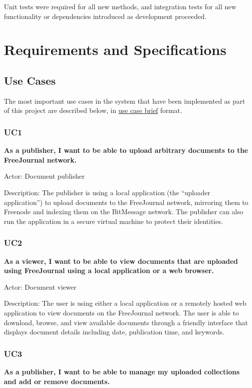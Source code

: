 \documentclass[letterpaper,10pt,oneside]{sphinxmanual}
\begin{document}
Unit tests were required for all new methods, and integration tests for all new functionality or dependencies
introduced as development proceeded.


\chapter{Requirements and Specifications}
\label{requirements:requirements-and-specifications}\label{requirements::doc}

\section{Use Cases}
\label{requirements:use-cases}
The most important use cases in the system that have been implemented as part of this project are described below, in
\href{http://tynerblain.com/blog/2007/04/24/apr-use-case-briefs/}{use case brief} format.


\subsection{UC1}
\label{requirements:uc1}
\textbf{As a publisher, I want to be able to upload arbitrary documents to the FreeJournal network.}

Actor: Document publisher

Description: The publisher is using a local application (the ``uploader application'') to upload documents to the FreeJournal
network, mirroring them to Freenode and indexing them on the BitMessage network.  The publisher can also run the application in
a secure virtual machine to protect their identities.


\subsection{UC2}
\label{requirements:uc2}
\textbf{As a viewer, I want to be able to view documents that are uploaded using FreeJournal using a local application or a web browser.}

Actor: Document viewer

Description: The user is using either a local application or a remotely hosted web application to view documents on the FreeJournal
network.  The user is able to download, browse, and view available documents through a friendly interface that displays document
details including date, publication time, and keywords.


\subsection{UC3}
\label{requirements:uc3}
\textbf{As a publisher, I want to be able to manage my uploaded collections and add or remove documents.}
\end{document}
